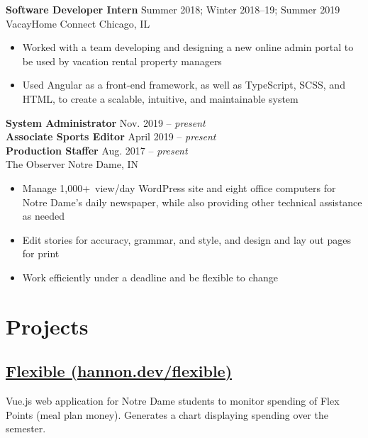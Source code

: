 \documentclass[letterpaper,10pt]{article}
\newcommand{\present}{{\itshape present}}
\newcommand{\employmentspace}{\vspace{-5pt}}
\begin{document}
\begin{minipage}[t]{\dimexpr.67\textwidth-.5\columnsep}
\textbf{Software Developer Intern} \hfill Summer 2018; Winter 2018--19; Summer 2019 \\
VacayHome Connect \hfill Chicago, IL

\employmentspace
\begin{itemize}
    \item Worked with a team developing and designing a new online admin portal to be used by vacation rental property managers
    \item Used Angular as a front-end framework, as well as TypeScript, SCSS, and HTML, to create a scalable, intuitive, and maintainable system
\end{itemize}

\textbf{System Administrator} \hfill Nov. 2019 -- \present \\
\textbf{Associate Sports Editor} \hfill April 2019 -- \present \\
\textbf{Production Staffer} \hfill Aug. 2017 -- \present \\
The Observer \hfill Notre Dame, IN

\employmentspace
\begin{itemize}
    \item Manage 1,000+~view/day WordPress site and eight office computers for Notre Dame’s daily newspaper, while also providing other technical assistance as needed
    \item Edit stories for accuracy, grammar, and style, and design and lay out pages for print
    \item Work efficiently under a deadline and be flexible to change
\end{itemize}

\section{Projects}

\subsection[Flexible]{\href{https://hannon.dev/flexible/}{Flexible (hannon.dev/flexible)}}
Vue.js web application for Notre Dame students to monitor spending of Flex Points (meal plan money). Generates a chart displaying spending over the semester.


\end{minipage}
\end{document}
